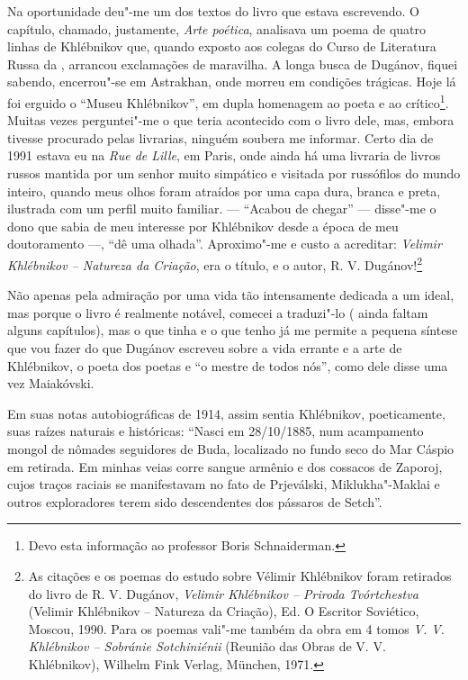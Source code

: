 {Na oportunidade deu"-me um dos textos do livro que estava escrevendo. O
capítulo, chamado, justamente, \emph{Arte poética}, analisava um poema
de quatro linhas de Khlébnikov que, quando exposto aos colegas do Curso
de Literatura Russa da , arrancou exclamações de maravilha. A longa
busca de Dugánov, fiquei sabendo, encerrou"-se em Astrakhan, onde
morreu em condições trágicas. Hoje lá foi erguido o ``Museu
Khlébnikov'', em dupla homenagem ao poeta e ao crítico\footnote{Devo
  esta informação ao professor Boris Schnaiderman.}. Muitas vezes
perguntei"-me o que teria acontecido com o livro dele, mas, embora
tivesse procurado pelas livrarias, ninguém soubera me informar. Certo
dia de 1991 estava eu na \emph{Rue de Lille}, em Paris, onde ainda há
uma livraria de livros russos mantida por um senhor muito simpático e
visitada por russófilos do mundo inteiro, quando meus olhos foram
atraídos por uma capa dura, branca e preta, ilustrada com um perfil muito
familiar. --- ``Acabou de chegar'' --- disse"-me o dono que sabia de meu
interesse por Khlébnikov desde a época de meu doutoramento ---, ``dê uma
olhada''. Aproximo"-me e custo a acreditar: \emph{Velimir Khlébnikov -- Natureza da Criação}, era o título, e o autor, R. V.
Dugánov!\footnote{As citações e os poemas do estudo sobre Vélimir
  Khlébnikov foram retirados do livro de R. V. Dugánov, \emph{Velimir
  Khlébnikov -- Priroda Tvórtchestva} (Velimir Khlébnikov -- Natureza da
Criação), Ed. O Escritor Soviético, Moscou, 1990. Para os poemas
  vali"-me também da obra em 4 tomos \emph{V. V. Khlébnikov --
Sobránie Sotchiniénii} (Reunião das Obras de V. V. Khlébnikov),
  Wilhelm Fink Verlag, München, 1971.}

Não apenas pela admiração por uma vida tão intensamente dedicada a um
ideal, mas porque o livro é realmente notável, comecei a traduzi"-lo (
ainda faltam alguns capítulos), mas o que tinha e o que tenho já me
permite a pequena síntese que vou fazer do que Dugánov escreveu sobre a
vida errante e a arte de Khlébnikov, o poeta dos poetas e ``o mestre de
todos nós'', como dele disse uma vez Maiakóvski.

Em suas notas autobiográficas de 1914, assim sentia Khlébnikov,
poeticamente, suas raízes naturais e históricas: ``Nasci em 28/10/1885,
num acampamento mongol de nômades seguidores de Buda, localizado no
fundo seco do Mar Cáspio em retirada. Em minhas veias corre sangue
armênio e dos cossacos de Zaporoj, cujos traços raciais se manifestavam
no fato de Prjeválski, Miklukha"-Maklai e outros exploradores terem sido
descendentes dos pássaros de Setch''.

}
